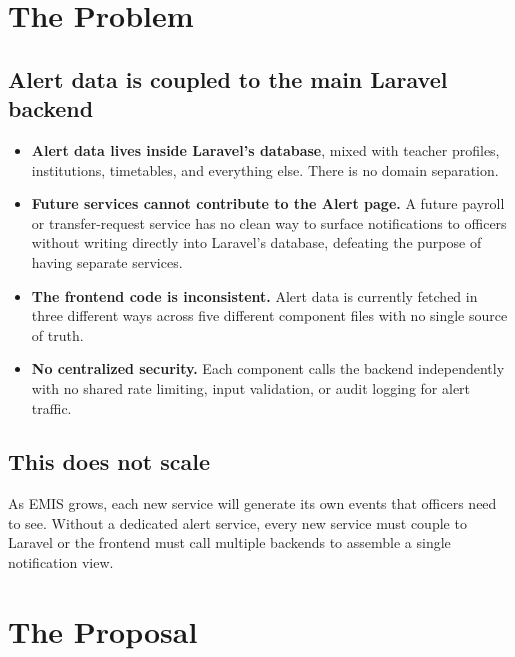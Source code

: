 \documentclass[11pt]{article}
\begin{document}
\section{The Problem}

\subsection{Alert data is coupled to the main Laravel backend}

\begin{itemize}
  \item \textbf{Alert data lives inside Laravel's database}, mixed with teacher profiles,
        institutions, timetables, and everything else. There is no domain separation.
  \item \textbf{Future services cannot contribute to the Alert page.} A future payroll or
        transfer-request service has no clean way to surface notifications to officers without
        writing directly into Laravel's database, defeating the purpose of having separate services.
  \item \textbf{The frontend code is inconsistent.} Alert data is currently fetched in three
        different ways across five different component files with no single source of truth.
  \item \textbf{No centralized security.} Each component calls the backend independently with
        no shared rate limiting, input validation, or audit logging for alert traffic.
\end{itemize}

\subsection{This does not scale}

As EMIS grows, each new service will generate its own events that officers need to see. Without
a dedicated alert service, every new service must couple to Laravel or the frontend must call
multiple backends to assemble a single notification view.

\section{The Proposal}
\end{document}
